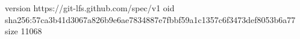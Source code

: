 version https://git-lfs.github.com/spec/v1
oid sha256:57ca3b41d3067a826b9e6ae7834887e7fbbf59a1c1357c6f3473def8053b6a77
size 11068
